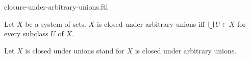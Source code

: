 \documentclass{naproche-library}
\begin{document}
\begin{smodule}[title=Closure Under Arbitrary Unions]{closure-under-arbitrary-unions.ftl}

\begin{definition}[forthel,id=FOUNDATIONS_14_3959378992431104]
  Let $X$ be a system of sets.
  $X$ is closed under arbitrary unions iff $\bigcup U \in X$ for every  subclass $U$ of $X$.

  Let $X$ is closed under unions stand for $X$ is closed under arbitrary unions.
\end{definition}
\end{smodule}
\end{document}

